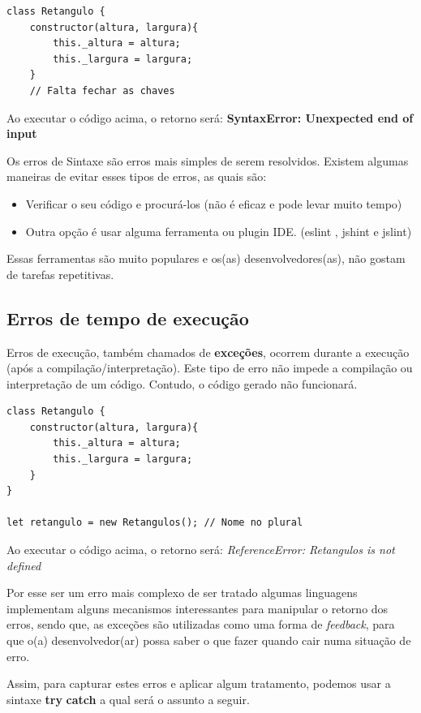 \begin{verbatim}
class Retangulo { 
	constructor(altura, largura){
		this._altura = altura;
		this._largura = largura;
	}	
	// Falta fechar as chaves
\end{verbatim}
		
Ao executar o código acima, o retorno será: \textbf{SyntaxError: Unexpected end of input}

Os erros de Sintaxe são erros mais simples de serem resolvidos. Existem algumas maneiras de evitar esses tipos de erros, as quais são:

\begin{itemize}
	\item Verificar o seu código e procurá-los (não é eficaz e pode levar muito tempo)
	\item Outra opção é usar alguma ferramenta ou plugin IDE. (eslint , jshint e jslint)
\end{itemize}

Essas ferramentas são muito populares e os(as) desenvolvedores(as), não gostam de tarefas repetitivas.


\subsection{Erros de tempo de execução}
Erros de execução, também chamados de \textbf{exceções}, ocorrem durante a execução (após a compilação/interpretação). Este tipo de erro não impede a compilação ou interpretação de um código. Contudo, o código gerado não funcionará.

\begin{verbatim}
class Retangulo { 
	constructor(altura, largura){
		this._altura = altura;
		this._largura = largura;
	}	
}

let retangulo = new Retangulos(); // Nome no plural
\end{verbatim}

Ao executar o código acima, o retorno será: \textit{ReferenceError: Retangulos is not defined}

Por esse ser um erro mais complexo de ser tratado algumas linguagens implementam alguns mecanismos interessantes para manipular o retorno dos erros, sendo que, as exceções são utilizadas como uma forma de \textit{feedback}, para que o(a) desenvolvedor(ar) possa saber o que fazer quando cair numa situação de erro. 

Assim, para capturar estes erros e aplicar algum tratamento, podemos usar a sintaxe \textbf{try} \textbf{catch} a qual será o assunto a seguir.

